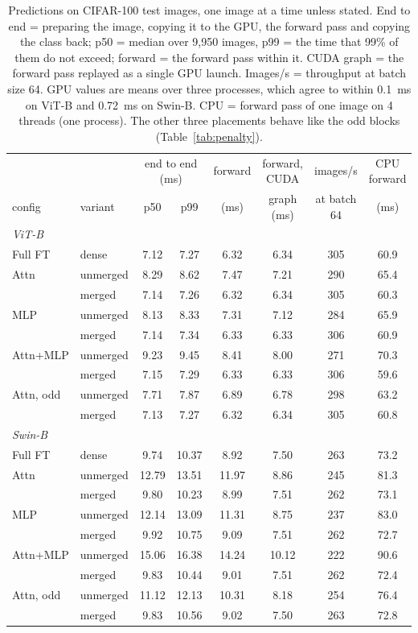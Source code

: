 \begin{table}[p]
\centering\footnotesize
\setlength{\tabcolsep}{3.5pt}
\begin{tabular}{llcccccc}
\toprule
 & & \multicolumn{2}{c}{end to end (ms)} & forward & forward, CUDA & images/s & CPU forward \\
config & variant & p50 & p99 & (ms) & graph (ms) & at batch 64 & (ms) \\
\midrule
\multicolumn{8}{l}{\emph{ViT-B}} \\
Full FT & dense & 7.12 & 7.27 & 6.32 & 6.34 & 305 & 60.9 \\
Attn & unmerged & 8.29 & 8.62 & 7.47 & 7.21 & 290 & 65.4 \\
 & merged & 7.14 & 7.26 & 6.32 & 6.34 & 305 & 60.3 \\
MLP & unmerged & 8.13 & 8.33 & 7.31 & 7.12 & 284 & 65.9 \\
 & merged & 7.14 & 7.34 & 6.33 & 6.33 & 306 & 60.9 \\
Attn+MLP & unmerged & 9.23 & 9.45 & 8.41 & 8.00 & 271 & 70.3 \\
 & merged & 7.15 & 7.29 & 6.33 & 6.33 & 306 & 59.6 \\
Attn, odd & unmerged & 7.71 & 7.87 & 6.89 & 6.78 & 298 & 63.2 \\
 & merged & 7.13 & 7.27 & 6.32 & 6.34 & 305 & 60.8 \\
\midrule
\multicolumn{8}{l}{\emph{Swin-B}} \\
Full FT & dense & 9.74 & 10.37 & 8.92 & 7.50 & 263 & 73.2 \\
Attn & unmerged & 12.79 & 13.51 & 11.97 & 8.86 & 245 & 81.3 \\
 & merged & 9.80 & 10.23 & 8.99 & 7.51 & 262 & 73.1 \\
MLP & unmerged & 12.14 & 13.09 & 11.31 & 8.75 & 237 & 83.0 \\
 & merged & 9.92 & 10.75 & 9.09 & 7.51 & 262 & 72.7 \\
Attn+MLP & unmerged & 15.06 & 16.38 & 14.24 & 10.12 & 222 & 90.6 \\
 & merged & 9.83 & 10.44 & 9.01 & 7.51 & 262 & 72.4 \\
Attn, odd & unmerged & 11.12 & 12.13 & 10.31 & 8.18 & 254 & 76.4 \\
 & merged & 9.83 & 10.56 & 9.02 & 7.50 & 263 & 72.8 \\
\bottomrule
\end{tabular}
\caption{Predictions on CIFAR-100 test images, one image at a time unless stated. End to end = preparing the image,
copying it to the GPU, the forward pass and copying the class back; p50 = median over 9,950 images, p99 = the time
that 99\% of them do not exceed; forward = the forward pass within it. CUDA graph = the forward pass replayed as a
single GPU launch. Images/s = throughput at batch size 64. GPU values are means over three processes, which agree
to within 0.1~ms on ViT-B and 0.72~ms on Swin-B. CPU = forward pass of one image on 4 threads (one process). The other three placements behave like the odd blocks (Table~\ref{tab:penalty}).}
\label{tab:latency}
\end{table}


